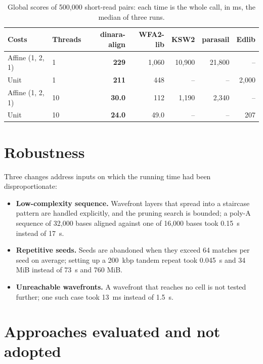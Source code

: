 \documentclass[10pt]{article}
\begin{document}
\begin{table}[t]
\caption{Global scores of 500{,}000 short-read pairs: each time is the whole call, in ms, the median of three runs.}\label{tab:batch}
\centering\footnotesize
\setlength{\tabcolsep}{4pt}
\begin{tabular}{@{}llrrrrr@{}}
\toprule
Costs & Threads & dinara-align & WFA2-lib & KSW2 & parasail & Edlib \\
\midrule
Affine (1, 2, 1) & 1 & \textbf{229} & 1{,}060 & 10{,}900 & 21{,}800 & – \\
Unit & 1 & \textbf{211} & 448 & – & – & 2{,}000 \\
Affine (1, 2, 1) & 10 & \textbf{30.0} & 112 & 1{,}190 & 2{,}340 & – \\
Unit & 10 & \textbf{24.0} & 49.0 & – & – & 207 \\
\bottomrule
\end{tabular}
\end{table}

\section{Robustness}

Three changes address inputs on which the running time had been disproportionate:

\begin{itemize}
  \item \textbf{Low-complexity sequence.} Wavefront layers that spread into a staircase pattern are handled explicitly, and the pruning search is bounded; a poly-A sequence of 32{,}000 bases aligned against one of 16{,}000 bases took 0.15~s instead of 17~s.
  \item \textbf{Repetitive seeds.} Seeds are abandoned when they exceed 64 matches per seed on average; setting up a 200~kbp tandem repeat took 0.045~s and 34 MiB instead of 73~s and 760 MiB.
  \item \textbf{Unreachable wavefronts.} A wavefront that reaches no cell is not tested further; one such case took 13~ms instead of 1.5~s.
\end{itemize}

\section{Approaches evaluated and not adopted}
\end{document}
